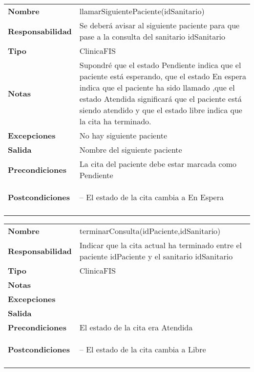 



\begin{table}[H]
\centering
	  \begin{tabularx}{\textwidth}{l|X}
    \textbf{Nombre}        & llamarSiguientePaciente(idSanitario) \\ 
    \textbf{Responsabilidad}  &  Se deberá avisar al siguiente paciente para que pase a la consulta del sanitario idSanitario \\ 
    \textbf{Tipo}       & ClinicaFIS  \\ 
    \textbf{Notas}        & Supondré que el estado Pendiente indica que el paciente está esperando, que el estado En espera indica que el paciente ha sido llamado ,que el estado Atendida significará que el paciente está siendo atendido y que el estado libre indica que la cita ha terminado.  \\ 
    \textbf{Excepciones}    & No hay siguiente paciente \\ 
    \textbf{Salida}        & Nombre del siguiente paciente\\ 
    \textbf{Precondiciones}    & La cita del paciente debe estar marcada como Pendiente \\ 
    \textbf{Postcondiciones}  &
    \begin{itemizenomargins}
   \item[--] El estado de la cita cambia a En Espera
   \end{itemizenomargins} \\ \\
  \end{tabularx}

\end{table}


\begin{table}[H]
\centering
	  \begin{tabularx}{\textwidth}{l|X}
    \textbf{Nombre}        & terminarConsulta(idPaciente,idSanitario) \\ 
    \textbf{Responsabilidad}  & Indicar que la cita actual ha terminado entre el paciente idPaciente y el sanitario idSanitario \\ 
    \textbf{Tipo}        &  ClinicaFIS\\ 
    \textbf{Notas}        &  \\ 
    \textbf{Excepciones}    &  \\ 
    \textbf{Salida}        &  \\ 
    \textbf{Precondiciones}    & El estado de la cita era Atendida  \\ 
    \textbf{Postcondiciones}  & \begin{itemizenomargins}
   \item[--] El estado de la cita cambia a Libre
   \end{itemizenomargins} \\ \\
  \end{tabularx}

\end{table}

